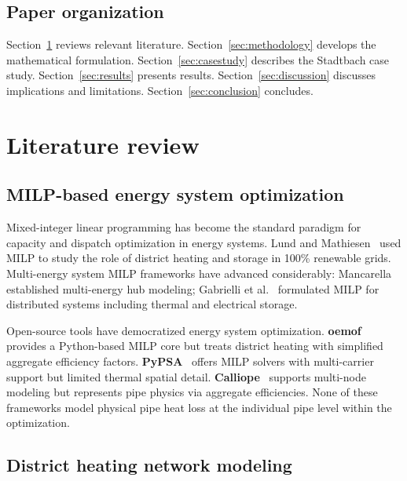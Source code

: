 \documentclass[a4paper,fleqn]{cas-dc}
\begin{document}
\subsection{Paper organization}

Section~\ref{sec:literature} reviews relevant literature. Section~\ref{sec:methodology} develops the mathematical formulation. Section~\ref{sec:casestudy} describes the Stadtbach case study. Section~\ref{sec:results} presents results. Section~\ref{sec:discussion} discusses implications and limitations. Section~\ref{sec:conclusion} concludes.


\section{Literature review}\label{sec:literature}

\subsection{MILP-based energy system optimization}

Mixed-integer linear programming has become the standard paradigm for capacity and dispatch optimization in energy systems. Lund and Mathiesen~\citep{Lund2009} used MILP to study the role of district heating and storage in 100\% renewable grids. Multi-energy system MILP frameworks have advanced considerably: Mancarella~\citep{Mancarella2014} established multi-energy hub modeling; Gabrielli et al.~\citep{Gabrielli2018} formulated MILP for distributed systems including thermal and electrical storage.

Open-source tools have democratized energy system optimization. \textbf{oemof}~\citep{Hilpert2018} provides a Python-based MILP core but treats district heating with simplified aggregate efficiency factors. \textbf{PyPSA}~\citep{Brown2018} offers MILP solvers with multi-carrier support but limited thermal spatial detail. \textbf{Calliope}~\citep{Pfenninger2018} supports multi-node modeling but represents pipe physics via aggregate efficiencies. None of these frameworks model physical pipe heat loss at the individual pipe level within the optimization.

\subsection{District heating network modeling}
\end{document}

